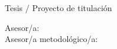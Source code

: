 \begin{titlepage}
\centering

{\large \ThesisInstitution\par}
\vspace{0.5cm}
{\large \ThesisProgram\par}

\vfill

{\bfseries\Large \ThesisTitle\par}

\vfill

{\large Tesis / Proyecto de titulación\par}
\vspace{0.8cm}
{\large \ThesisAuthorOne\par}
{\large \ThesisAuthorTwo\par}

\vfill

\begin{flushleft}
Asesor/a: \ThesisAdvisor\\
Asesor/a metodológico/a: \ThesisMethodologyAdvisor
\end{flushleft}

\vfill

{\large \ThesisLocation\par}
{\large \ThesisDate\par}

\end{titlepage}
